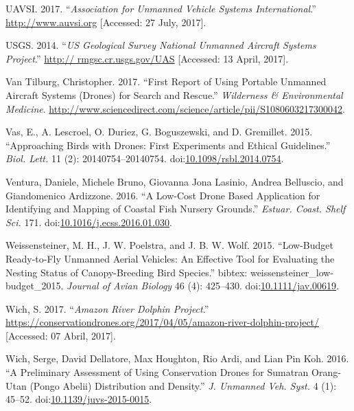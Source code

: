 \documentclass[]{interact}
\theoremstyle{plain}%
\theoremstyle{definition}
\theoremstyle{remark}
\begin{document}
\hypertarget{ref-AUVSI2017}{}
UAVSI. 2017. ``\emph{Association for Unmanned Vehicle Systems
International}.'' \url{http://www.auvsi.org} {[}Accessed: 27 July,
2017{]}.

\hypertarget{ref-USGS2014}{}
USGS. 2014. ``\emph{US Geological Survey National Unmanned Aircraft
Systems Project}.''
\href{http://\%20rmgsc.cr.usgs.gov/UAS}{http:// rmgsc.cr.usgs.gov/UAS}
{[}Accessed: 13 April, 2017{]}.

\hypertarget{ref-van_tilburg_first_2017}{}
Van Tilburg, Christopher. 2017. ``First Report of Using Portable
Unmanned Aircraft Systems (Drones) for Search and Rescue.''
\emph{Wilderness \& Environmental Medicine}.
\url{http://www.sciencedirect.com/science/article/pii/S1080603217300042}.

\hypertarget{ref-vas_approaching_2015}{}
Vas, E., A. Lescroel, O. Duriez, G. Boguszewski, and D. Gremillet. 2015.
``Approaching Birds with Drones: First Experiments and Ethical
Guidelines.'' \emph{Biol. Lett.} 11 (2): 20140754--20140754.
doi:\href{https://doi.org/10.1098/rsbl.2014.0754}{10.1098/rsbl.2014.0754}.

\hypertarget{ref-ventura_low-cost_2016}{}
Ventura, Daniele, Michele Bruno, Giovanna Jona Lasinio, Andrea
Belluscio, and Giandomenico Ardizzone. 2016. ``A Low-Cost Drone Based
Application for Identifying and Mapping of Coastal Fish Nursery
Grounds.'' \emph{Estuar. Coast. Shelf Sci.} 171.
doi:\href{https://doi.org/10.1016/j.ecss.2016.01.030}{10.1016/j.ecss.2016.01.030}.

\hypertarget{ref-weissensteiner_low-budget_2015}{}
Weissensteiner, M. H., J. W. Poelstra, and J. B. W. Wolf. 2015.
``Low-Budget Ready-to-Fly Unmanned Aerial Vehicles: An Effective Tool
for Evaluating the Nesting Status of Canopy-Breeding Bird Species.''
bibtex: weissensteiner\_low-budget\_2015. \emph{Journal of Avian
Biology} 46 (4): 425--430.
doi:\href{https://doi.org/10.1111/jav.00619}{10.1111/jav.00619}.

\hypertarget{ref-WichS2017}{}
Wich, S. 2017. ``\emph{Amazon River Dolphin Project}.''
\url{https://conservationdrones.org/2017/04/05/amazon-river-dolphin-project/}
{[}Accessed: 07 Abril, 2017{]}.

\hypertarget{ref-wich_preliminary_2016}{}
Wich, Serge, David Dellatore, Max Houghton, Rio Ardi, and Lian Pin Koh.
2016. ``A Preliminary Assessment of Using Conservation Drones for
Sumatran Orang-Utan (Pongo Abelii) Distribution and Density.'' \emph{J.
Unmanned Veh. Syst.} 4 (1): 45--52.
doi:\href{https://doi.org/10.1139/juvs-2015-0015}{10.1139/juvs-2015-0015}.
\end{document}
